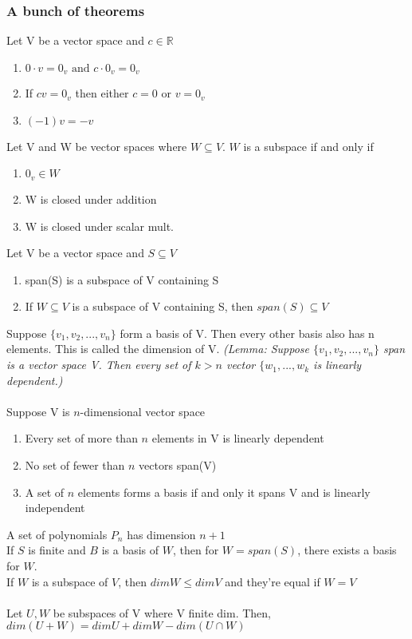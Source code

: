 \documentclass{article}
\begin{document}
\subsubsection{A bunch of theorems}
Let V be a vector space and $c\in\mathds{R}$
\begin{enumerate}
    \item $0\cdot v = 0_v\text{  and  } c\cdot 0_v = 0_v$
    \item If $cv=0_v$ then either $c=0$ or $v=0_v$
    \item $(-1)v = -v$
\end{enumerate}
Let V and W be vector spaces where $W\subseteq V$. $W$ is a subspace if and only if
\begin{enumerate}
    \item $0_v\in W$
    \item W is closed under addition
    \item W is closed under scalar mult.
\end{enumerate}
Let V be a vector space and $S\subseteq V$
\begin{enumerate}
    \item span(S) is a subspace of V containing S
    \item If $W\subseteq V$ is a subspace of V containing S, then $span(S) \subseteq V$
\end{enumerate}
Suppose $\{v_1,v_2,...,v_n\}$ form a basis of V. Then every other basis also has n elements. This is called the dimension of V. \textit{(Lemma: Suppose $\{v_1,v_2,...,v_n\}$ span is a vector space V. Then every set of $k>n$ vector $\{w_1,...,w_k$ is linearly dependent.)
}\\\\
Suppose V is $n$-dimensional vector space
\begin{enumerate}
    \item Every set of more than $n$ elements in V is linearly dependent
    \item No set of fewer than $n$ vectors span(V)
    \item A set of $n$ elements forms a basis if and only it spans V and is linearly independent
\end{enumerate}
A set of polynomials $P_n$ has dimension $n+1$\\
If $S$ is finite and $B$ is a basis of $W$, then for $W=span(S)$, there exists a basis for $W$.\\
If $W$ is a subspace of $V$, then $dimW\leq dimV$ and they're equal if $W=V$\\\\
Let $U,W$ be subspaces of V where V finite dim. Then, $dim(U+W) = dimU+dimW-dim(U\cap W)$
\end{document}
